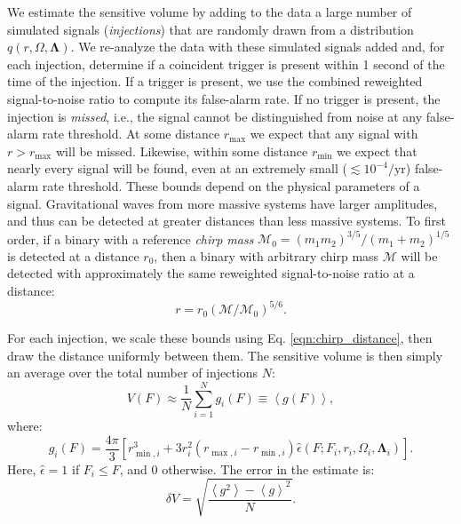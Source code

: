 We estimate the sensitive volume by adding to the data a large number of
simulated signals (\emph{injections}) that are randomly drawn from a
distribution $q(r, \Omega, \mathbf{\Lambda})$. We re-analyze the data with 
these simulated signals added and,
for each injection, determine if a coincident trigger is present within 1
second of the time of the injection. If a trigger is present, we use the
combined reweighted signal-to-noise ratio to compute its false-alarm rate. 
If no trigger is present, the injection is
\emph{missed}, i.e., the signal cannot be distinguished from noise at any
false-alarm rate
threshold. At some distance $r_{\max}$ we expect that any signal with $r >
r_{\max}$ will be missed.  Likewise, within some distance $r_{\min}$ we expect
that nearly every signal will be
found, even at an extremely small ($\lesssim 10^{-4} / \mathrm{yr}$)
false-alarm rate
threshold. These bounds depend on the physical parameters of a signal.
Gravitational waves from more massive systems have larger amplitudes, and thus
can be detected at greater distances than less massive systems. To first order,
if a binary with a reference \emph{chirp mass} $\mathcal{M}_0 = (m_1
m_2)^{3/5}/(m_1 + m_2)^{1/5}$ is detected at a distance $r_0$, then a binary
with arbitrary chirp mass $\mathcal{M}$ will be detected with approximately the
same reweighted signal-to-noise ratio at a distance:
\begin{equation}
r = r_{0}(\mathcal{M}/\mathcal{M}_{0})^{5/6}.
\label{eqn:chirp_distance}
\end{equation}

For each injection, we scale these bounds using Eq. \eqref{eqn:chirp_distance},
then draw the distance uniformly between them. The sensitive volume
is then simply an average over the total number of injections $N$:
\begin{equation}
V(F) \approx \frac{1}{N} \sum_{i=1}^N g_i(F) \equiv \left<g(F)\right>,
\end{equation}
where:
\begin{equation}
g_i(F) = \frac{4\pi}{3} \left[ r_{\min,i}^3 + 3r_i^2(r_{\max,i}-r_{\min,i})\hat{\epsilon}(F; F_i, r_i, \Omega_i, \mathbf{\Lambda}_i)\right].
\end{equation}
Here, $\hat{\epsilon} = 1$ if $F_i \leq F$, and
$0$ otherwise. The error in the estimate is:%
\begin{equation}
\delta V = \sqrt{\frac{\left<g^2\right> - \left<g\right>^2}{N}}.
\end{equation}

